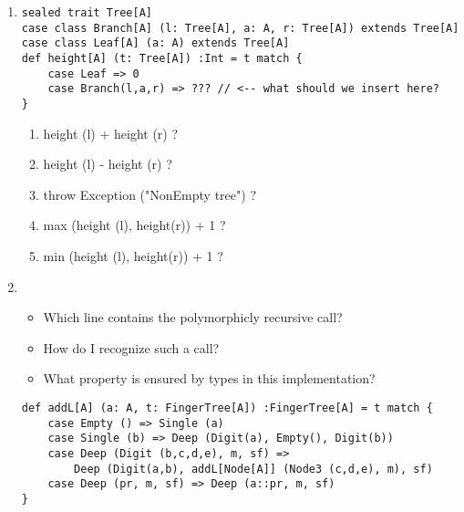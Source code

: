 \begin{enumerate}
    \item 
    \begin{verbatim}
sealed trait Tree[A]
case class Branch[A] (l: Tree[A], a: A, r: Tree[A]) extends Tree[A]
case class Leaf[A] (a: A) extends Tree[A]
def height[A] (t: Tree[A]) :Int = t match {
    case Leaf => 0
    case Branch(l,a,r) => ??? // <-- what should we insert here?
} 
    \end{verbatim}
    
    \begin{enumerate}
        \item height (l) + height (r) ?
        \item height (l) - height (r) ?
        \item throw Exception ("NonEmpty tree") ?
        \item max (height (l), height(r)) + 1 ?
        \item min (height (l), height(r)) + 1 ?
    \end{enumerate}
    
    
    \item 
    \begin{itemize}
        \item Which line contains the polymorphicly recursive call?
        \item How do I recognize such a call?
        \item What property is ensured by types in this implementation?
    \end{itemize}
    
    \begin{verbatim}
def addL[A] (a: A, t: FingerTree[A]) :FingerTree[A] = t match {
    case Empty () => Single (a)
    case Single (b) => Deep (Digit(a), Empty(), Digit(b))
    case Deep (Digit (b,c,d,e), m, sf) =>
        Deep (Digit(a,b), addL[Node[A]] (Node3 (c,d,e), m), sf)
    case Deep (pr, m, sf) => Deep (a::pr, m, sf)
}
    \end{verbatim}
    
\end{enumerate}
